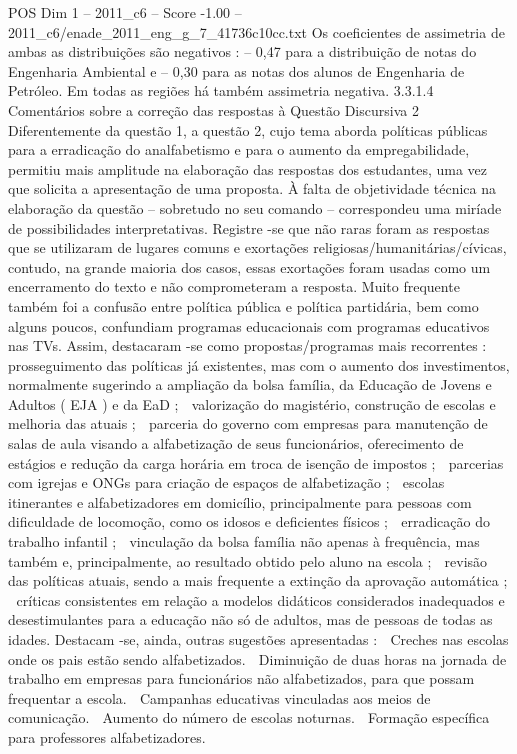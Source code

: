 \begin{textsample}{POS Dim 1 – 2011\_c6 – Score -1.00 – 2011\_c6/enade\_2011\_eng\_g\_7\_41736c10cc.txt}
Os coeficientes de assimetria de ambas as distribuições são negativos : – 0,47 para a distribuição de notas do Engenharia Ambiental e – 0,30 para as notas dos alunos de Engenharia de Petróleo.
Em todas as regiões há também assimetria negativa. 3.3.1.4 Comentários sobre a correção das respostas à Questão Discursiva 2 Diferentemente da questão 1, a questão 2, cujo tema aborda políticas públicas para a erradicação do analfabetismo e para o aumento da empregabilidade, permitiu mais amplitude na elaboração das respostas dos estudantes, uma vez que solicita a apresentação de uma proposta.
À falta de objetividade técnica na elaboração da questão – sobretudo no seu comando – correspondeu uma miríade de possibilidades interpretativas.
Registre -se que não raras foram as respostas que se utilizaram de lugares comuns e exortações religiosas/humanitárias/cívicas, contudo, na grande maioria dos casos, essas exortações foram usadas como um encerramento do texto e não comprometeram a resposta.
Muito frequente também foi a confusão entre política pública e política partidária, bem como alguns poucos, confundiam programas educacionais com programas educativos nas TVs.
Assim, destacaram -se como propostas/programas mais recorrentes :  prosseguimento das políticas já existentes, mas com o aumento dos investimentos, normalmente sugerindo a ampliação da bolsa família, da Educação de Jovens e Adultos ( EJA ) e da EaD ;  valorização do magistério, construção de escolas e melhoria das atuais ;  parceria do governo com empresas para manutenção de salas de aula visando a alfabetização de seus funcionários, oferecimento de estágios e redução da carga horária em troca de isenção de impostos ;  parcerias com igrejas e ONGs para criação de espaços de alfabetização ;  escolas itinerantes e alfabetizadores em domicílio, principalmente para pessoas com dificuldade de locomoção, como os idosos e deficientes físicos ;  erradicação do trabalho infantil ;  vinculação da bolsa família não apenas à frequência, mas também e, principalmente, ao resultado obtido pelo aluno na escola ;  revisão das políticas atuais, sendo a mais frequente a extinção da aprovação automática ;  críticas consistentes em relação a modelos didáticos considerados inadequados e desestimulantes para a educação não só de adultos, mas de pessoas de todas as idades.
Destacam -se, ainda, outras sugestões apresentadas :  Creches nas escolas onde os pais estão sendo alfabetizados.  Diminuição de duas horas na jornada de trabalho em empresas para funcionários não alfabetizados, para que possam frequentar a escola.  Campanhas educativas vinculadas aos meios de comunicação.  Aumento do número de escolas noturnas.  Formação específica para professores alfabetizadores.

\end{textsample}
